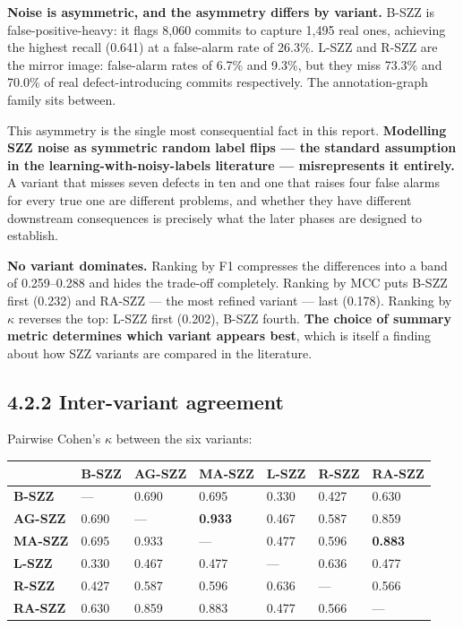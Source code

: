 \textbf{Noise is asymmetric, and the asymmetry differs by variant.}
B-SZZ is false-positive-heavy: it flags 8,060 commits to capture 1,495
real ones, achieving the highest recall (0.641) at a false-alarm rate of
26.3\%. L-SZZ and R-SZZ are the mirror image: false-alarm rates of 6.7\%
and 9.3\%, but they miss 73.3\% and 70.0\% of real defect-introducing
commits respectively. The annotation-graph family sits between.

This asymmetry is the single most consequential fact in this report.
\textbf{Modelling SZZ noise as symmetric random label flips --- the
standard assumption in the learning-with-noisy-labels literature ---
misrepresents it entirely.} A variant that misses seven defects in ten
and one that raises four false alarms for every true one are different
problems, and whether they have different downstream consequences is
precisely what the later phases are designed to establish.

\textbf{No variant dominates.} Ranking by F1 compresses the differences
into a band of 0.259--0.288 and hides the trade-off completely. Ranking
by MCC puts B-SZZ first (0.232) and RA-SZZ --- the most refined variant
--- last (0.178). Ranking by \ensuremath{\kappa} reverses the top: L-SZZ first (0.202),
B-SZZ fourth. \textbf{The choice of summary metric determines which
variant appears best}, which is itself a finding about how SZZ variants
are compared in the literature.

\subsection{4.2.2 Inter-variant
agreement}\label{inter-variant-agreement}

Pairwise Cohen's \ensuremath{\kappa} between the six variants:

\begin{longtable}[]{@{}lllllll@{}}
\toprule\noalign{}
& B-SZZ & AG-SZZ & MA-SZZ & L-SZZ & R-SZZ & RA-SZZ \\
\midrule\noalign{}
\endhead
\bottomrule\noalign{}
\endlastfoot
\textbf{B-SZZ} & --- & 0.690 & 0.695 & 0.330 & 0.427 & 0.630 \\
\textbf{AG-SZZ} & 0.690 & --- & \textbf{0.933} & 0.467 & 0.587 &
0.859 \\
\textbf{MA-SZZ} & 0.695 & 0.933 & --- & 0.477 & 0.596 &
\textbf{0.883} \\
\textbf{L-SZZ} & 0.330 & 0.467 & 0.477 & --- & 0.636 & 0.477 \\
\textbf{R-SZZ} & 0.427 & 0.587 & 0.596 & 0.636 & --- & 0.566 \\
\textbf{RA-SZZ} & 0.630 & 0.859 & 0.883 & 0.477 & 0.566 & --- \\
\end{longtable}

